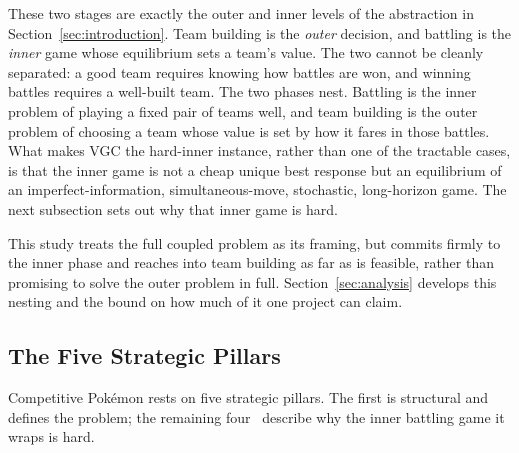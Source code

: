 These two stages are exactly the outer and inner levels of the abstraction in
Section~\ref{sec:introduction}. Team building is the \emph{outer} decision, and
battling is the \emph{inner} game whose equilibrium sets a team's value. The two
cannot be cleanly separated: a good team requires knowing how battles are won,
and winning battles requires a well-built team. The two phases nest. Battling is
the inner problem of playing a fixed pair of teams well, and team building is the
outer problem of choosing a team whose value is set by how it fares in those
battles. What makes VGC the hard-inner instance, rather than one of the tractable
cases, is that the inner game is not a cheap unique best response but an
equilibrium of an imperfect-information, simultaneous-move, stochastic,
long-horizon game. The next subsection sets out why that inner game is hard.

This study treats the full coupled problem as its framing, but commits firmly to
the inner phase and reaches into team building as far as is feasible, rather than
promising to solve the outer problem in full. Section~\ref{sec:analysis} develops
this nesting and the bound on how much of it one project can claim.

\subsection{The Five Strategic Pillars}

Competitive Pok\'{e}mon rests on five strategic pillars. The first is structural
and defines the problem; the remaining four~\cite{traylor_vgc} describe why the
inner battling game it wraps is hard.

